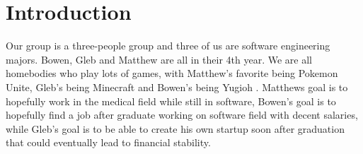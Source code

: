 \chapter{Introduction \\
\label{Chapter::Introduction}}


\hspace {2em}Our group is a three-people group and three of us are software engineering majors. Bowen, Gleb and Matthew are all in their 4th year. We are all homebodies who play lots of games, with Matthew’s favorite being Pokemon Unite, Gleb’s being Minecraft and Bowen’s being Yugioh . Matthews goal is to hopefully work in the medical field while still in software, Bowen’s goal is to hopefully find a job after graduate working on software field with decent salaries, while Gleb’s goal is to be able to create his own startup soon after graduation that could eventually lead to financial stability.